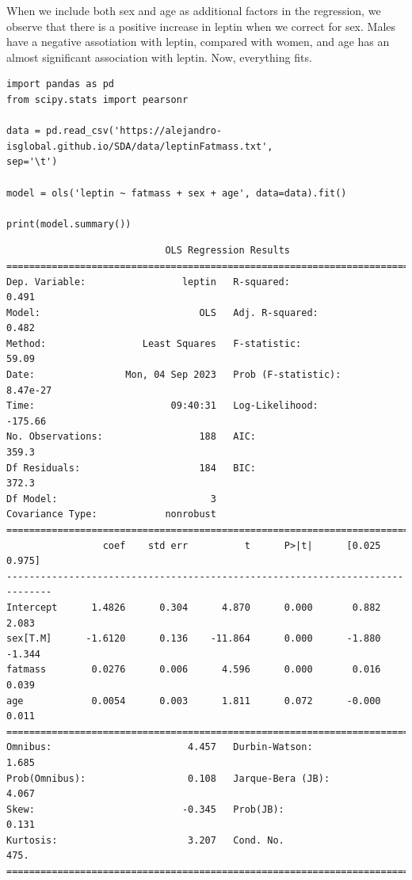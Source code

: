 \documentclass[
]{book}
\begin{document}
When we include both sex and age as additional factors in the regression, we observe that there is a positive increase in leptin when we correct for sex. Males have a negative assotiation with leptin, compared with women, and age has an almost significant association with leptin. Now, everything fits.

\begin{verbatim}
import pandas as pd
from scipy.stats import pearsonr

data = pd.read_csv('https://alejandro-isglobal.github.io/SDA/data/leptinFatmass.txt', 
sep='\t')

model = ols('leptin ~ fatmass + sex + age', data=data).fit()

print(model.summary())
\end{verbatim}

\begin{verbatim}
                            OLS Regression Results                            
==============================================================================
Dep. Variable:                 leptin   R-squared:                       0.491
Model:                            OLS   Adj. R-squared:                  0.482
Method:                 Least Squares   F-statistic:                     59.09
Date:                Mon, 04 Sep 2023   Prob (F-statistic):           8.47e-27
Time:                        09:40:31   Log-Likelihood:                -175.66
No. Observations:                 188   AIC:                             359.3
Df Residuals:                     184   BIC:                             372.3
Df Model:                           3                                         
Covariance Type:            nonrobust                                         
==============================================================================
                 coef    std err          t      P>|t|      [0.025      0.975]
------------------------------------------------------------------------------
Intercept      1.4826      0.304      4.870      0.000       0.882       2.083
sex[T.M]      -1.6120      0.136    -11.864      0.000      -1.880      -1.344
fatmass        0.0276      0.006      4.596      0.000       0.016       0.039
age            0.0054      0.003      1.811      0.072      -0.000       0.011
==============================================================================
Omnibus:                        4.457   Durbin-Watson:                   1.685
Prob(Omnibus):                  0.108   Jarque-Bera (JB):                4.067
Skew:                          -0.345   Prob(JB):                        0.131
Kurtosis:                       3.207   Cond. No.                         475.
==============================================================================
\end{verbatim}
\end{document}

